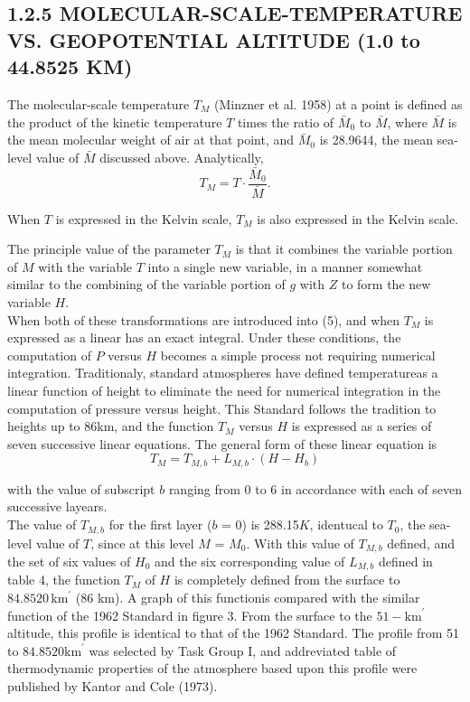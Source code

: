 \documentclass{article}
\begin{document}
\subsection*{1.2.5 MOLECULAR-SCALE-TEMPERATURE VS. GEOPOTENTIAL ALTITUDE (1.0 to 44.8525 KM)}

The molecular-scale temperature \(T_M\) (Minzner et al. 1958) at a point is defined as the product of the kinetic temperature \(T\) times the ratio of \(\bar{M}_0\) to \(\bar{M}\), where \(\bar{M}\) is the mean molecular weight of air at that point, and \(\bar{M}_0\) is 28.9644, the mean sea-level value of \(\bar{M}\) discussed above. Analytically,
\begin{equation}
  T_M = T \cdot \frac{\bar{M}_0}{\bar{M}}. \tag{22}
\end{equation}

When \(T\) is expressed in the Kelvin scale, \(T_M\) is also expressed in the Kelvin scale.

The principle value of the parameter \(T_M\) is that it combines the variable portion of \(M\) with the variable \(T\) into a single new variable, in a manner somewhat similar to the combining of the variable portion of \(g\) with \(Z\) to form the new variable \(H\).\\
When both of these transformations are introduced into (5), and when \(T_M\) is expressed as a linear has an exact integral. Under these conditions, the computation of \(P\) versus \(H\) becomes a simple process not requiring numerical integration. Traditionaly, standard atmospheres have defined temperatureas a linear function of height to eliminate the need for numerical integration in the computation of pressure versus height. This Standard follows the tradition to heights up to 86km, and the function \(T_M\) versus \(H\) is expressed as a series of seven successive linear equations. The general form of these linear equation is 
\begin{equation}
  T_M = T_{M,b} + L_{M,b}\cdot (H - H_b) 
  \tag{23}
\end{equation}

with the value of subscript \(b\) ranging from 0 to 6 in accordance with each of seven successive layears.\\
The value of \(T_{M,b}\) for the first layer (\(b\) = 0) is 288.15\(K\), identucal to \(T_0\), the sea-level value of \(T\), since at this level \(M\) = \(M_0\). With this value of \(T_{M,b}\) defined, and the set of six values of \(H_0\) and the six corresponding value of \(L_{M,b}\) defined in table 4, the function \(T_M\) of \(H\) is completely defined from the surface to \(84.8520 \, \text{km}^{\prime}\) (86 km). A graph of this functionis compared with the similar function of the 1962 Standard in figure 3. From the surface to the \(51-\text{km}^\prime\) altitude, this profile is identical to that of the 1962 Standard. The profile from 51 to \(84.8520 \text{km}^\prime\) was selected by Task Group I, and addreviated table of thermodynamic properties of the atmosphere based upon this profile were published by Kantor and Cole (1973).
\end{document}

